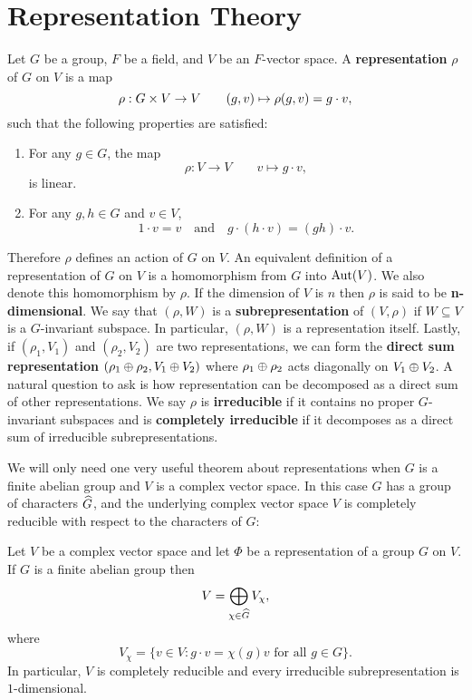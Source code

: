   \section{Representation Theory}\label{append:Representation_Theory}
    Let $G$ be a group, $F$ be a field, and $V$ be an $F$-vector space. A \textbf{representation} $\rho$ of $G$ on $V$ is a map
    \[
      \rho:G \times V \to V \qquad (g,v) \mapsto \rho(g,v) = g \cdot v,
    \]
    such that the following properties are satisfied:
    \begin{enumerate}
      \item For any $g \in G$, the map
      \[
        \rho:V \to V \qquad v \mapsto g \cdot v,
      \]
      is linear.
      \item For any $g,h \in G$ and $v \in V$,
      \[
        1 \cdot v = v \quad \text{and} \quad g \cdot (h \cdot v) = (gh) \cdot v.
      \]
    \end{enumerate}
    Therefore $\rho$ defines an action of $G$ on $V$. An equivalent definition of a representation of $G$ on $V$ is a homomorphism from $G$ into $\operatorname{\mathrm{Aut}}(V)$. We also denote this homomorphism by $\rho$. If the dimension of $V$ is $n$ then $\rho$ is said to be \textbf{n-dimensional}. We say that $(\rho,W)$ is a \textbf{subrepresentation} of $(V,\rho)$ if $W \subseteq V$ is a $G$-invariant subspace. In particular, $(\rho,W)$ is a representation itself. Lastly, if $(\rho_{1},V_{1})$ and $(\rho_{2},V_{2})$ are two representations, we can form the \textbf{direct sum representation} $(\rho_{1} \oplus \rho_{2},V_{1} \oplus V_{2})$ where $\rho_{1} \oplus \rho_{2}$ acts diagonally on $V_{1} \oplus V_{2}$. A natural question to ask is how representation can be decomposed as a direct sum of other representations. We say $\rho$ is \textbf{irreducible} if it contains no proper $G$-invariant subspaces and is \textbf{completely irreducible} if it decomposes as a direct sum of irreducible subrepresentations.

    We will only need one very useful theorem about representations when $G$ is a finite abelian group and $V$ is a complex vector space. In this case $G$ has a group of characters $\widehat{G}$, and the underlying complex vector space $V$ is completely reducible with respect to the characters of $G$:

    \begin{theorem}\label{thm:finite_abelian_representation_is_completely_reducible}
      Let $V$ be a complex vector space and let $\Phi$ be a representation of a group $G$ on $V$. If $G$ is a finite abelian group then
      \[
        V = \bigoplus_{\chi \in \widehat{G}}V_{\chi},
      \]
      where
      \[
        V_{\chi} = \{v \in V:g \cdot v = \chi(g)v \text{ for all } g \in G\}.
      \]
      In particular, $V$ is completely reducible and every irreducible subrepresentation is $1$-dimensional.
    \end{theorem}
